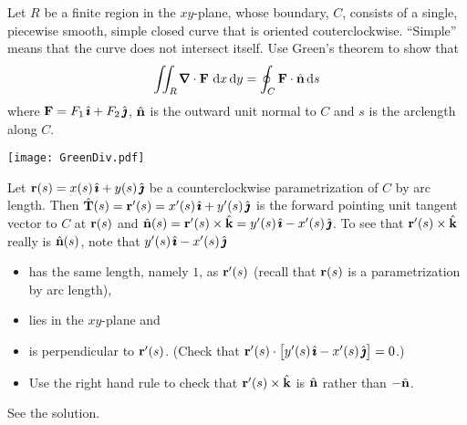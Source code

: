 \begin{question}
 Let $R$ be a finite region in the $xy$-plane,
whose boundary, $C$, consists of a single, piecewise smooth, simple
closed curve that is oriented couterclockwise.
``Simple'' means that the curve does not intersect itself.
Use Green's theorem to show that 
\begin{equation*}
\dblInt_R\vnabla\cdot\vF\ \dee{x}\,\dee{y}=\oint_C\vF\cdot\hn\,\dee{s}
\end{equation*}
where $\mathbf{F}=F_1\,\hat{\pmb{\imath}}+F_2\,\hat{\pmb{\jmath}}$, $\hat{\mathbf{n}}$ is the outward unit normal to $C$ and $s$ 
is the arclength along $C$.
\begin{center}
       \texttt{[image: GreenDiv.pdf]}
\end{center}

\end{question}

\begin{hint} 
Let $\mathbf{r}(s)=x(s)\,\hat{\pmb{\imath}}+y(s)\,\hat{\pmb{\jmath}}$ be a counterclockwise parametrization of 
$C$ by arc length. Then $\hat{\mathbf{T}}(s) = \mathbf{r}'(s) = x'(s)\,\hat{\pmb{\imath}}+y'(s)\,\hat{\pmb{\jmath}}$
is the forward pointing unit tangent vector to $C$ at $\mathbf{r}(s)$
and $\hat{\mathbf{n}}(s) = \mathbf{r}'(s)\times\hat{\mathbf{k}}=y'(s)\,\hat{\pmb{\imath}}-x'(s)\,\hat{\pmb{\jmath}}$. To see
that $\mathbf{r}'(s)\times\hat{\mathbf{k}}$ really is $\hat{\mathbf{n}}(s)$, note that 
$y'(s)\,\hat{\pmb{\imath}}-x'(s)\,\hat{\pmb{\jmath}}$ 
\begin{itemize}\itemsep1pt \parskip0pt 
\item
has the same length, namely $1$, as $\mathbf{r}'(s)$ (recall that $\mathbf{r}(s)$ is a
parametrization by arc length),
\item
lies in the $xy$-plane and 

\item
is perpendicular to $\mathbf{r}'(s)$. 
(Check that $\mathbf{r}'(s)\cdot\big[y'(s)\,\hat{\pmb{\imath}}-x'(s)\,\hat{\pmb{\jmath}}\big]=0$.) 
\item
Use the right hand rule to check that $\mathbf{r}'(s)\times\hat{\mathbf{k}}$ is 
$\hat{\mathbf{n}}$ rather than $-\hat{\mathbf{n}}$.
\end{itemize}
\end{hint}

\begin{answer} 
See the solution.
\end{answer}

